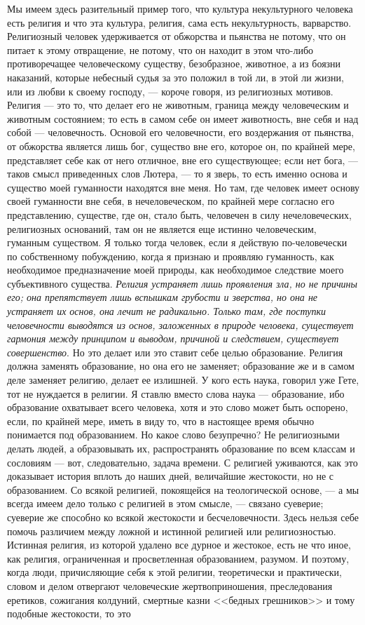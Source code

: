\documentclass[12pt]{article}
\begin{document}
Мы имеем здесь разительный пример того, что культура некультурного человека есть религия и что эта культура, религия, сама есть некультурность, варварство. Религиозный человек удерживается от обжорства и пьянства не потому, что он питает к этому отвращение, не потому, что он находит в этом что-либо противоречащее человеческому существу, безобразное, животное, а из боязни наказаний, которые небесный судья за это положил в той ли, в этой ли жизни, или из любви к своему господу, --- короче говоря, из религиозных мотивов. Религия --- это то, что делает его не животным, граница между человеческим и животным состоянием; то есть в самом себе он имеет животность, вне себя и над собой --- человечность. Основой его человечности, его воздержания от пьянства, от обжорства является лишь бог, существо вне его, которое он, по крайней мере, представляет себе как от него отличное, вне его существующее; если нет бога, --- таков смысл приведенных слов Лютера, --- то я зверь, то есть именно основа и существо моей гуманности находятся вне меня. Но там, где человек имеет основу своей гуманности вне себя, в нечеловеческом, по крайней мере согласно его представлению, существе, где он, стало быть, человечен в силу нечеловеческих, религиозных оснований, там он не является еще истинно человеческим, гуманным существом. Я только тогда человек, если я действую по-человечески по собственному побуждению, когда я признаю и проявляю гуманность, как необходимое предназначение моей природы, как необходимое следствие моего субъективного существа. \emph{Религия устраняет лишь проявления зла, но не причины его; она препятствует лишь вспышкам грубости и зверства, но она не устраняет их основ, она лечит не радикально. Только там, где поступки человечности выводятся из основ, заложенных в природе человека, существует гармония между принципом и выводом, причиной и следствием, существует совершенство}. Но это делает или это ставит себе целью образование. Религия должна заменять образование, но она его не заменяет; образование же и в самом деле заменяет религию, делает ее излишней. У кого есть наука, говорил уже Гете, тот не нуждается в религии. Я ставлю вместо слова наука --- образование, ибо образование охватывает всего человека, хотя и это слово может быть оспорено, если, по крайней мере, иметь в виду то, что в настоящее время обычно понимается под образованием. Но какое слово безупречно? Не религиозными делать людей, а образовывать их, распространять образование по всем классам и сословиям --- вот, следовательно, задача времени. С религией уживаются, как это доказывает история вплоть до наших дней, величайшие жестокости, но не с образованием. Со всякой религией, покоящейся на теологической основе, --- а мы всегда имеем дело только с религией в этом смысле, --- связано суеверие; суеверие же способно ко всякой жестокости и бесчеловечности. Здесь нельзя себе помочь различием между ложной и истинной религией или религиозностью. Истинная религия, из которой удалено все дурное и жестокое, есть не что иное, как религия, ограниченная и просветленная образованием, разумом. И поэтому, когда люди, причисляющие себя к этой религии, теоретически и практически, словом и делом отвергают человеческие жертвоприношения, преследования еретиков, сожигания колдуний, смертные казни <<бедных грешников>> и тому подобные жестокости, то это 
\end{document}
